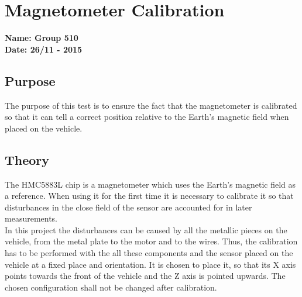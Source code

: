 \pagebreak
\section{Magnetometer Calibration} \label{app:magnetoCalibration}
\textbf{Name: Group 510}\\
\textbf{Date: 26/11 - 2015}

\subsection{Purpose}
The purpose of this test is to ensure the fact that the magnetometer is calibrated so that it can tell a correct position relative to the Earth's magnetic field when placed on the vehicle.

\subsection{Theory}
The HMC5883L chip is a magnetometer which uses the Earth's magnetic field as a reference. When using it for the first time it is necessary to calibrate it so that disturbances in the close field of the sensor are accounted for in later measurements.\\
%
In this project the disturbances can be caused by all the metallic pieces on the vehicle, from the metal plate to the motor and to the wires. Thus, the calibration has to be performed with the all these components and the sensor placed on the vehicle at a fixed place and orientation. It is chosen to place it, so that its X axis points towards the front of the vehicle and the Z axis is pointed upwards. The chosen configuration shall not be changed after calibration.

